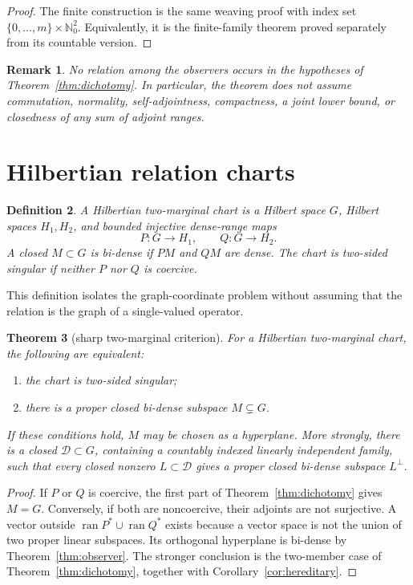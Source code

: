 \documentclass[11pt]{article}
\newtheorem{theorem}{Theorem}[section]
\newtheorem{definition}[theorem]{Definition}
\newtheorem{remark}[theorem]{Remark}
\newcommand{\N}{\mathbb N_0}
\newcommand{\ran}{\operatorname{ran}}
\newcommand{\cD}{\mathcal D}
\begin{document}
\begin{proof}
The finite construction is the same weaving proof with index set
\(\{0,\ldots,m\}\times\N^2\).  Equivalently, it is the finite-family theorem
proved separately from its countable version.
\end{proof}

\begin{remark}\label{rem:strength}
No relation among the observers occurs in the hypotheses of
Theorem~\ref{thm:dichotomy}.  In particular, the theorem does not assume
commutation, normality, self-adjointness, compactness, a joint lower bound, or
closedness of any sum of adjoint ranges.
\end{remark}

\section{Hilbertian relation charts}\label{sec:relations}

\begin{definition}\label{def:chart}
A \emph{Hilbertian two-marginal chart} is a Hilbert space \(G\), Hilbert
spaces \(H_1,H_2\), and bounded injective dense-range maps
\[
  P:G\to H_1,\qquad Q:G\to H_2.
  \tag{4.1}
\]
A closed \(M\subset G\) is \emph{bi-dense} if \(PM\) and \(QM\) are dense.
The chart is \emph{two-sided singular} if neither \(P\) nor \(Q\) is
coercive.
\end{definition}

This definition isolates the graph-coordinate problem without assuming that
the relation is the graph of a single-valued operator.

\begin{theorem}[sharp two-marginal criterion]\label{thm:two}
For a Hilbertian two-marginal chart, the following are equivalent:
\begin{enumerate}[label=\textup{(\alph*)}]
  \item the chart is two-sided singular;
  \item there is a proper closed bi-dense subspace \(M\subsetneq G\).
\end{enumerate}
If these conditions hold, \(M\) may be chosen as a hyperplane.  More
strongly, there is a closed \(\cD\subset G\), containing a countably indexed
linearly independent family, such that every closed nonzero
\(L\subset\cD\) gives a proper closed bi-dense subspace \(L^\perp\).
\end{theorem}

\begin{proof}
If \(P\) or \(Q\) is coercive, the first part of
Theorem~\ref{thm:dichotomy} gives \(M=G\).  Conversely, if both are
noncoercive, their adjoints are not surjective.  A vector outside
\(\ran P^*\cup\ran Q^*\) exists because a vector space is not the union of
two proper linear subspaces.  Its orthogonal hyperplane is bi-dense by
Theorem~\ref{thm:observer}.  The stronger conclusion is the two-member case
of Theorem~\ref{thm:dichotomy}, together with
Corollary~\ref{cor:hereditary}.
\end{proof}
\end{document}
